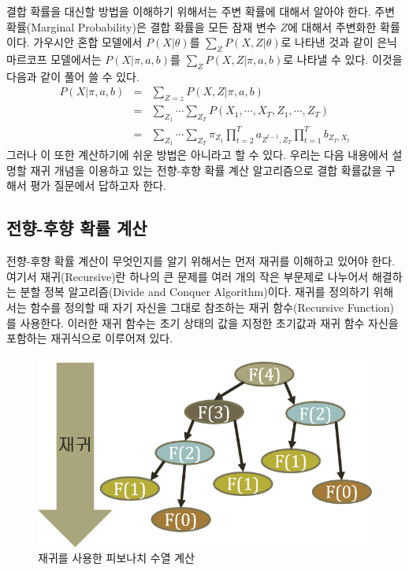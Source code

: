\documentclass[a4paper]{oblivoir}
\begin{document}
결합 확률을 대신할 방법을 이해하기 위해서는 주변 확률에 대해서 알아야 한다. 주변 확률(Marginal Probability)은 결합 확률을 모든 잠재 변수 $Z$에 대해서 주변화한 확률이다. 가우시안 혼합 모델에서 $P(X|\theta)$를 $\sum_{Z} P(X,Z|\theta)$로 나타낸 것과 같이 은닉 마르코프 모델에서는 $P(X|\pi,a,b)$를 $\sum_{Z} P(X,Z|\pi,a,b)$로 나타낼 수 있다. 이것을 다음과 같이 풀어 쓸 수 있다.
\begin{eqnarray}
P(X|\pi,a,b) & = & \sum_{Z=z} P(X,Z|\pi,a,b) \nonumber \\
& = & \sum_{Z_{1}} \cdots \sum_{Z_{T}} P(X_{1},\cdots,X_{T},Z_{1},\cdots,Z_{T}) \nonumber \\
& = & \sum_{Z_{1}} \cdots \sum_{Z_{T}} {\pi}_{Z_{1}} \prod_{t=2}^{T} a_{Z^{t-1},Z_{T}} \prod_{t=1}^{T} b_{Z_{T},X_{t}} \label{eq:9-10}
\end{eqnarray}
그러나 이 또한 계산하기에 쉬운 방법은 아니라고 할 수 있다. 우리는 다음 내용에서 설명할 재귀 개념을 이용하고 있는 전향-후향 확률 계산 알고리즘으로 결합 확률값을 구해서 평가 질문에서 답하고자 한다. \\

\subsection{전향-후향 확률 계산}

전향-후향 확률 계산이 무엇인지를 알기 위해서는 먼저 재귀를 이해하고 있어야 한다. 여기서 재귀(Recursive)란 하나의 큰 문제를 여러 개의 작은 부문제로 나누어서 해결하는 분할 정복 알고리즘(Divide and Conquer Algorithm)이다. 재귀를 정의하기 위해서는 함수를 정의할 때 자기 자신을 그대로 참조하는 재귀 함수(Recursive Function)를 사용한다. 이러한 재귀 함수는 초기 상태의 값을 지정한 초기값과 재귀 함수 자신을 포함하는 재귀식으로 이루어져 있다. \\

\begin{figure}[ht] \centering 
\includegraphics[scale=0.6]{fig9_10.png} 
\caption{재귀를 사용한 피보나치 수열 계산}
\label{fig:9-10}
\end{figure}
\end{document}
